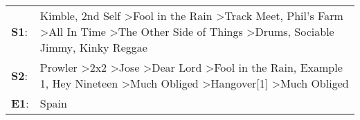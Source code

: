 \begin{supertabular}{p{0.03\textwidth}p{0.92\textwidth}}
 \textbf{S1}:  &    Kimble\textsuperscript{}, \enspace 2nd Self\textsuperscript{} \textgreater \enspace Fool in the Rain\textsuperscript{} \textgreater \enspace Track Meet\textsuperscript{}, \enspace Phil's Farm\textsuperscript{} \textgreater \enspace All In Time\textsuperscript{} \textgreater \enspace The Other Side of Things\textsuperscript{} \textgreater \enspace Drums\textsuperscript{}, \enspace Sociable Jimmy\textsuperscript{}, \enspace Kinky Reggae\textsuperscript{}  \enspace  \\
 \textbf{S2}:  &  Prowler\textsuperscript{} \textgreater \enspace 2x2\textsuperscript{} \textgreater \enspace Jose\textsuperscript{} \textgreater \enspace Dear Lord\textsuperscript{} \textgreater \enspace Fool in the Rain\textsuperscript{}, \enspace Example 1\textsuperscript{}, \enspace Hey Nineteen\textsuperscript{} \textgreater \enspace Much Obliged\textsuperscript{} \textgreater \enspace Hangover[1]\textsuperscript{} \textgreater \enspace Much Obliged\textsuperscript{}  \enspace  \\
 \textbf{E1}:  &                                                                                                                                                                                                                                                                                                                                                                                                                                                     Spain\textsuperscript{}  \enspace  \\
\end{supertabular}
